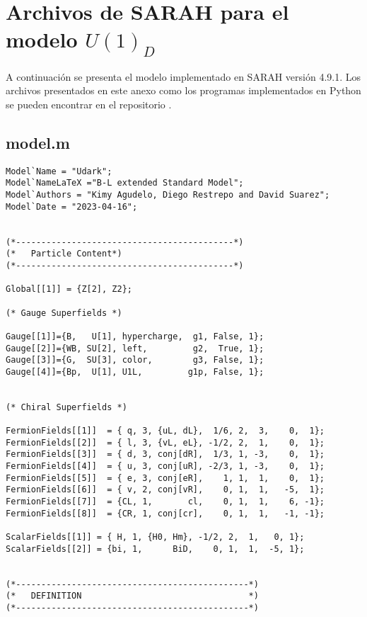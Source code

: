\cleardoublepage

\chapter{Archivos de SARAH para el modelo $U(1)_D$}
\label{AppendixE}
A continuación se presenta el modelo implementado en SARAH versión 4.9.1. Los archivos presentados en este anexo como los programas implementados en Python se pueden encontrar en el repositorio .             
\section{model.m}
\begin{lstlisting}
Model`Name = "Udark";
Model`NameLaTeX ="B-L extended Standard Model";
Model`Authors = "Kimy Agudelo, Diego Restrepo and David Suarez";
Model`Date = "2023-04-16";


(*-------------------------------------------*)
(*   Particle Content*)
(*-------------------------------------------*)

Global[[1]] = {Z[2], Z2};

(* Gauge Superfields *)

Gauge[[1]]={B,   U[1], hypercharge,  g1, False, 1};
Gauge[[2]]={WB, SU[2], left,         g2,  True, 1};
Gauge[[3]]={G,  SU[3], color,        g3, False, 1};
Gauge[[4]]={Bp,  U[1], U1L,         g1p, False, 1};


(* Chiral Superfields *)

FermionFields[[1]]  = { q, 3, {uL, dL},  1/6, 2,  3,    0,  1};  
FermionFields[[2]]  = { l, 3, {vL, eL}, -1/2, 2,  1,    0,  1};
FermionFields[[3]]  = { d, 3, conj[dR],  1/3, 1, -3,    0,  1};
FermionFields[[4]]  = { u, 3, conj[uR], -2/3, 1, -3,    0,  1};
FermionFields[[5]]  = { e, 3, conj[eR],    1, 1,  1,    0,  1};
FermionFields[[6]]  = { v, 2, conj[vR],    0, 1,  1,   -5,  1};
FermionFields[[7]]  = {CL, 1,       cl,    0, 1,  1,    6, -1};
FermionFields[[8]]  = {CR, 1, conj[cr],    0, 1,  1,   -1, -1};

ScalarFields[[1]] = { H, 1, {H0, Hm}, -1/2, 2,  1,   0, 1};
ScalarFields[[2]] = {bi, 1,      BiD,    0, 1,  1,  -5, 1};


(*----------------------------------------------*)
(*   DEFINITION                                 *)
(*----------------------------------------------*)


\end{lstlisting}
